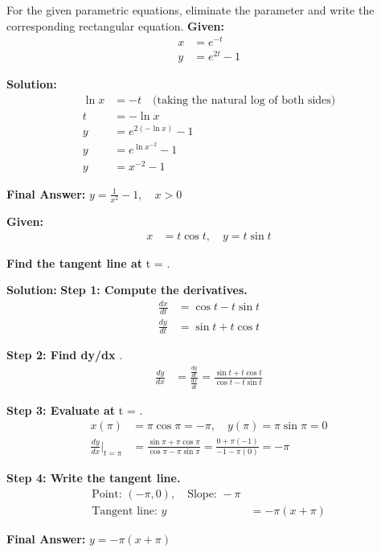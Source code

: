 \documentclass[12pt]{article}
\theoremstyle{beautifulthm}
\begin{document}
\begin{tcolorbox}[colback=examplebg, colframe=red!75!black, title=\textbf{EXAMPLE 1: Find the Integral of the Function}, fonttitle=\bfseries, sharp corners]
For the given parametric equations, eliminate the
parameter and write the corresponding
rectangular equation.
\textbf{Given:}
\begin{align*}
x &= e^{-t} \\
y &= e^{2t} - 1
\end{align*}

\tcblower
\textbf{Solution:} 
\begin{align*}
\ln x &= -t \quad \text{(taking the natural log of both sides)} \\
t &= -\ln x \\
y &= e^{2(-\ln x)} - 1 \\
y &= e^{\ln x^{-2}} - 1 \\
y &= x^{-2} - 1
\end{align*}

\textbf{Final Answer:} \( y = \frac{1}{x^2} - 1, \quad x > 0 \)
\end{tcolorbox}




\begin{tcolorbox}[colback=examplebg, colframe=red!75!black, title=\textbf{EXAMPLE 2: Tangent Line to the Parametric Curve}, fonttitle=\bfseries, sharp corners]
\textbf{Given:}
\begin{align*}
x &= t \cos t, \quad y = t \sin t
\end{align*}

\textbf{Find the tangent line at } t = \pi.


\tcblower
\textbf{Solution:} 
\textbf{Step 1: Compute the derivatives.}
\begin{align*}
\frac{dx}{dt} &= \cos t - t \sin t \\
\frac{dy}{dt} &= \sin t + t \cos t
\end{align*}

\textbf{Step 2: Find dy/dx} .
\begin{align*}
\frac{dy}{dx} &= \frac{\frac{dy}{dt}}{\frac{dx}{dt}} = \frac{\sin t + t \cos t}{\cos t - t \sin t}
\end{align*}

\textbf{Step 3: Evaluate at } t = \pi.
\begin{align*}
x(\pi) &= \pi \cos \pi = -\pi, \quad y(\pi) = \pi \sin \pi = 0 \\
\frac{dy}{dx}\Big|_{t = \pi} &= \frac{\sin \pi + \pi \cos \pi}{\cos \pi - \pi \sin \pi} = \frac{0 + \pi (-1)}{-1 - \pi (0)} = -\pi
\end{align*}

\textbf{Step 4: Write the tangent line.}
\begin{align*}
\text{Point: } (-\pi, 0), \quad \text{Slope: } -\pi \\
\text{Tangent line: } y &= -\pi (x + \pi)
\end{align*}

\textbf{Final Answer:} \( y = -\pi (x + \pi) \)
\end{tcolorbox}
\end{document}

